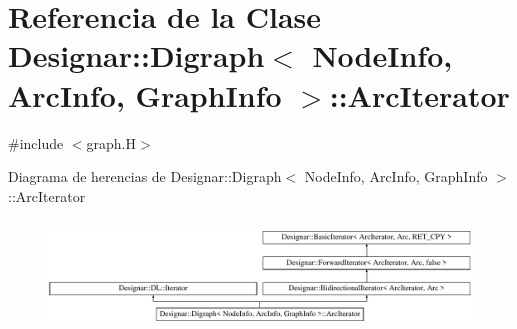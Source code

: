 \hypertarget{class_designar_1_1_digraph_1_1_arc_iterator}{}\section{Referencia de la Clase Designar\+:\+:Digraph$<$ Node\+Info, Arc\+Info, Graph\+Info $>$\+:\+:Arc\+Iterator}
\label{class_designar_1_1_digraph_1_1_arc_iterator}


{\ttfamily \#include $<$graph.\+H$>$}

Diagrama de herencias de Designar\+:\+:Digraph$<$ Node\+Info, Arc\+Info, Graph\+Info $>$\+:\+:Arc\+Iterator\begin{figure}[H]
\begin{center}
\leavevmode
\includegraphics[height=2.947368cm]{class_designar_1_1_digraph_1_1_arc_iterator}
\end{center}
\end{figure}
